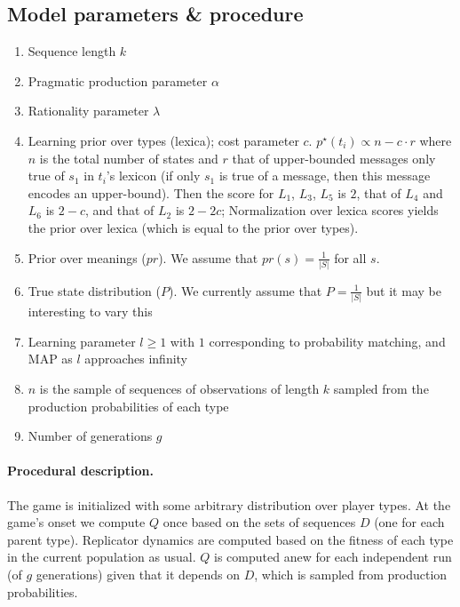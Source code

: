 \documentclass[11pt]{article}
\begin{document}
\subsection{Model parameters \& procedure} 
\begin{enumerate}
  \item Sequence length $k$
  \item Pragmatic production parameter $\alpha$
  \item Rationality parameter $\lambda$
  \item Learning prior over types (lexica); cost parameter $c$. $p^\star(t_i) \propto n - c \cdot r$ where $n$ is the total number of states and $r$ that of upper-bounded messages only true of $s_1$ in $t_i$'s lexicon (if only $s_1$ is true of a message, then this message encodes an upper-bound). Then the score for $L_1$, $L_3$, $L_5$ is $2$, that of $L_4$ and $L_6$ is $2-c$, and that of $L_2$ is $2-2c$; Normalization over lexica scores yields the prior over lexica (which is equal to the prior over types).   
  \item Prior over meanings ($pr$). We assume that $pr(s) = \frac{1}{|S|}$ for all $s$.
  \item True state distribution ($P$). We currently assume that $P = \frac{1}{|S|}$ but it may be interesting to vary this
  \item Learning parameter $l \geq 1$ with $1$ corresponding to probability matching, and MAP as $l$ approaches infinity
  \item $n$ is the sample of sequences of observations of length $k$ sampled from the production probabilities of each type
  \item Number of generations $g$
\end{enumerate}



\paragraph{Procedural description.} The game is initialized with some arbitrary distribution over player types. At the game's onset we compute $Q$ once based on the sets  of sequences $D$ (one for each parent type). Replicator dynamics are computed based on the fitness of each type in the current population as usual. $Q$ is computed anew for each independent run (of $g$ generations) given that it depends on $D$, which is sampled from production probabilities.



%



\end{document}
